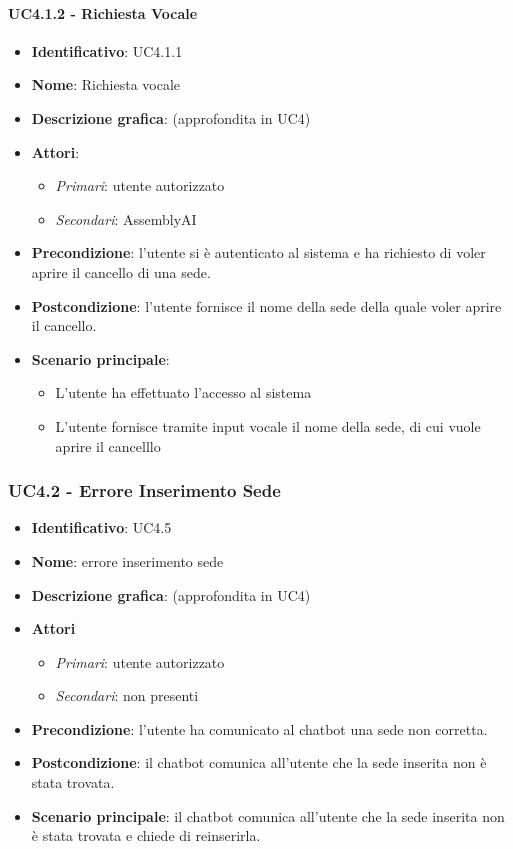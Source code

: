 \paragraph{UC4.1.2 - Richiesta Vocale}
\begin{itemize}
   \item \textbf{Identificativo}: UC4.1.1
   \item \textbf{Nome}: Richiesta vocale
   \item \textbf{Descrizione grafica}: (approfondita in UC4)
   \item \textbf{Attori}:
   \begin{itemize} 
       \item \textit{Primari}: utente autorizzato
       \item \textit{Secondari}: AssemblyAI
   \end{itemize}
       \item \textbf{Precondizione}: l'utente si è autenticato al sistema e ha richiesto di voler aprire il cancello di una sede. 
       \item \textbf{Postcondizione}: l'utente fornisce il nome della sede della quale voler aprire il cancello.
    \item \textbf{Scenario principale}: 
       \begin{itemize}
           \item L'utente ha effettuato l'accesso al sistema 
           \item L'utente fornisce tramite input vocale il nome della sede, di cui vuole aprire il cancelllo
       \end{itemize}
\end{itemize}

\subsubsection{UC4.2 - Errore Inserimento Sede}
\begin{itemize}
    \item \textbf{Identificativo}: UC4.5
    \item \textbf{Nome}: errore inserimento sede
    \item \textbf{Descrizione grafica}: (approfondita in UC4)
    \item \textbf{Attori}
 \begin{itemize} 
    \item \textit{Primari}: utente autorizzato 
    \item \textit{Secondari}: non presenti
 \end{itemize}
 \item \textbf{Precondizione}: l'utente ha comunicato al chatbot una sede non corretta.
 \item \textbf{Postcondizione}: il chatbot comunica all'utente che la sede inserita non è stata trovata.
 \item \textbf{Scenario principale}: il chatbot comunica all'utente che la sede inserita non è stata trovata e chiede di reinserirla.
\end{itemize}
\newpage